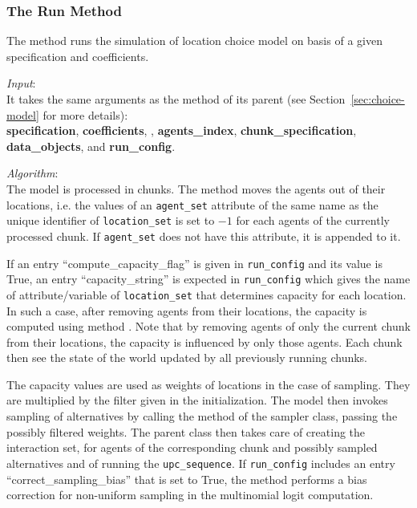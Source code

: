 %
\subsubsection{The Run Method}
%
The  method runs the simulation of location choice model \modelsindex on basis
of a given specification and coefficients. \coefficientsindex

{\it Input}:\\[1mm]
It takes the same arguments as the  method of its parent (see
Section~\ref{sec:choice-model} for more details): \\
{\bf specification}, {\bf coefficients}, , {\bf agents_index},
{\bf chunk_specification}, {\bf data_objects}, and {\bf run_config}.

{\it Algorithm}:\\[1mm]
The model \modelsindex is processed in chunks. The  method moves
the agents out of their locations, i.e. the values of an
\verb|agent_set| attribute of the same name as the unique identifier of
\verb|location_set| is set to $-1$ for each agents of the currently processed
chunk. If \verb|agent_set| does not have this attribute, \attributesindex it is appended to it.

If an entry ``compute_capacity_flag'' is given in \verb|run_config| and its
value is True, an entry ``capacity_string'' is expected in \verb|run_config|
which gives the name of attribute/variable \attributesindex\variablesindex of \verb|location_set| that
determines capacity for each location. In such a case, after removing agents
from their locations, the capacity is computed using method
. Note that by removing agents of only the
current chunk from their locations, the capacity is influenced by only those
agents. Each chunk then see the state of the world updated by all previously
running chunks.

The capacity values are used as weights of locations in the case of sampling.
They are multiplied by the filter given in the initialization.  The
model \modelsindex then invokes sampling of alternatives by calling the
 method of the sampler class, passing the possibly filtered
weights. The parent class then takes care of creating the interaction set, for
agents of the corresponding chunk and possibly sampled alternatives and of
running the \verb|upc_sequence|. If \verb|run_config| includes an entry
``correct_sampling_bias'' that is set to True, the method performs a bias
correction for non-uniform sampling in the multinomial logit computation.


